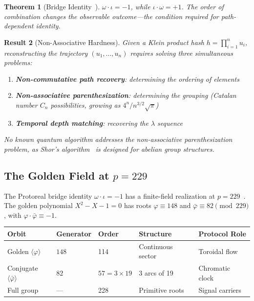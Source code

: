 \documentclass[12pt,a4paper]{article}
\newtheorem{theorem}{Theorem}[section]
\newtheorem{result}[theorem]{Result}
\begin{document}
\begin{theorem}[Bridge Identity~{\cite[Ch.~1]{PP-I-Ch1}}]
$\omega \cdot \iota = -1$, while $\iota \cdot \omega = +1$. The order of combination changes the observable outcome---the condition required for path-dependent identity.
\end{theorem}

\begin{result}[Non-Associative Hardness]
\label{res:hardness}
Given a Klein product hash $h = \prod_{i=1}^{n} u_i$, reconstructing the trajectory $(u_1, \ldots, u_n)$ requires solving three simultaneous problems:
\begin{enumerate}[noitemsep]
\item \textbf{Non-commutative path recovery}: determining the ordering of elements
\item \textbf{Non-associative parenthesization}: determining the grouping (Catalan number $C_n$ possibilities, growing as $4^n / n^{3/2}\sqrt{\pi}$)
\item \textbf{Temporal depth matching}: recovering the $\lambda$ sequence
\end{enumerate}
No known quantum algorithm addresses the non-associative parenthesization problem, as Shor's algorithm~\cite{shor1994} is designed for abelian group structures.
\end{result}

\subsection{The Golden Field at $p = 229$}

The Protoreal bridge identity $\omega \cdot \iota = -1$ has a finite-field realization at $p = 229$~\cite{PP-I-Ch5}. The golden polynomial $X^2 - X - 1 = 0$ has roots $\varphi \equiv 148$ and $\bar{\varphi} \equiv 82 \pmod{229}$, with $\varphi \cdot \bar{\varphi} \equiv -1$.

\begin{center}
\small
\begin{tabular}{@{}lllll@{}}
\toprule
\textbf{Orbit} & \textbf{Generator} & \textbf{Order} & \textbf{Structure} & \textbf{Protocol Role} \\
\midrule
Golden $\langle \varphi \rangle$     & $148$ & 114        & Continuous sector        & Toroidal flow \\
Conjugate $\langle \bar{\varphi} \rangle$ & $82$  & $57 = 3 \times 19$ & 3 arcs of 19   & Chromatic clock \\
Full group                            & ---   & 228        & Primitive roots          & Signal carriers \\
\bottomrule
\end{tabular}
\end{center}
\end{document}
